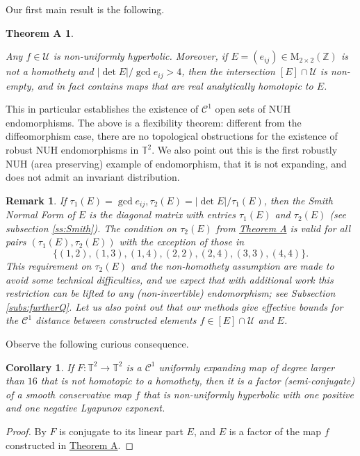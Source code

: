 \documentclass[11pt,letterpaper,reqno]{article}
\newtheorem{corollary}{Corollary}[section]
\newtheorem{remark}{Remark}[section]
\newtheorem*{theoremA}{Theorem A}
\newcommand{\Tor}{\mathbb{T}^2}
\newcommand{\Mat}{\mathrm{M}_{2 \times 2}(\mathbb{Z})}
\begin{document}
Our first main result is the following.
 


\begin{theoremA}\hypertarget{theoremA}{}
Any $f\in \mathcal U$ is non-uniformly hyperbolic. Moreover, if $E=(e_{ij})\in\Mat$ is not a homothety and $|\det E|/\gcd{e_{ij}}>4$, then the intersection $[E]\cap \mathcal U$ is non-empty, and in fact contains maps that are real analytically homotopic to $E$. 
\end{theoremA}

This in particular establishes the existence of $\mathcal C^1$ open sets of NUH endomorphisms. The above is a flexibility theorem: different from the diffeomorphism case, there are no topological obstructions for the existence of robust NUH endomorphisms in $\Tor$. We also point out this is the first robustly NUH (area preserving) example of endomorphism, that it is not expanding, and does not admit an invariant distribution.  



\begin{remark}\label{rem:hipotesisteoA}
If $\tau_1(E)=\gcd{e_{ij}}, \tau_2(E)=|\det E|/\tau_1(E)$,  then the Smith Normal Form of $E$ is the diagonal matrix with entries $\tau_1(E)$ and $\tau_2(E)$ (see subsection \ref{ss:Smith}). The condition on $\tau_2(E)$ from \hyperlink{theoremA}{Theorem A} is valid for all pairs $(\tau_1(E),\tau_2(E))$ with the exception of those in
 \[
 	\{(1,2), (1,3), (1,4), (2, 2), (2,4), (3,3), (4,4)\}.
 \] 
This requirement on $\tau_2(E)$ and the non-homothety assumption are made to avoid some technical difficulties,
 and we expect that with additional work this restriction can be lifted to any (non-invertible) endomorphism; see Subsection \ref{subs:furtherQ}. Let us also point out that our methods give effective bounds for the $\mathcal{C}^1$ distance between constructed elements $f\in [E]\cap \mathcal U$ and $E$.
\end{remark}


Observe the following curious consequence.

\begin{corollary}
If $F:\Tor\to\Tor$ is a $\mathcal{C}^1$ uniformly expanding map of degree larger than $16$ that is not homotopic to a homothety, then it is a factor (semi-conjugate) of a smooth conservative map $f$ that is non-uniformly hyperbolic with one positive and one negative Lyapunov exponent.
\end{corollary}

\begin{proof}
By \cite{shubendo} $F$ is conjugate to its linear part $E$, and $E$ is a factor of the map $f$ constructed in \hyperlink{theoremA}{Theorem A}.
\end{proof}
\end{document}
